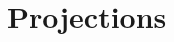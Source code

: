 \documentclass{article}
\let\subset\subseteq
\begin{document}
%
%
%
\clearpage
\section{Projections}
\printindex
\end{document}
